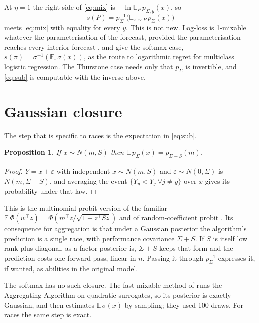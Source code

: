 \documentclass[11pt]{article}
\newtheorem{proposition}{Proposition}
\begin{document}
At $\eta=1$ the right side of \eqref{eq:mix} is $-\ln\mathbb E_P\,
p_{\Sigma,y}(x)$, so
\begin{equation}\label{eq:sub}
  s(P)=p_\Sigma^{-1}\!\big(\mathbb E_{x\sim P}\,p_\Sigma(x)\big)
\end{equation}
meets \eqref{eq:mix} with equality for every $y$. This is not new.
Log-loss is 1-mixable whatever the parameterisation of the forecast,
provided the parameterisation reaches every interior forecast
\citep[Section~6]{vanerven2012}, and \citet{foster2018} give the
softmax case, $s(\pi)=\sigma^{-1}(\mathbb E_\pi\sigma(x))$, as the
route to logarithmic regret for multiclass logistic regression. The
Thurstone case needs only that $p_\Sigma$ is invertible, and
\eqref{eq:sub} is computable with the inverse above.

\section{Gaussian closure}

The step that is specific to races is the expectation in
\eqref{eq:sub}.

\begin{proposition}\label{prop:closure}
If $x\sim N(m,S)$ then $\mathbb E\,p_\Sigma(x)=p_{\Sigma+S}(m)$.
\end{proposition}

\begin{proof}
$Y=x+\varepsilon$ with independent $x\sim N(m,S)$ and
$\varepsilon\sim N(0,\Sigma)$ is $N(m,\Sigma+S)$, and averaging the
event $\{Y_y<Y_j\ \forall j\ne y\}$ over $x$ gives its probability
under that law.
\end{proof}

This is the multinomial-probit version of the familiar
$\mathbb E\,\Phi(w^\top z)=\Phi(m^\top z/\sqrt{1+z^\top Sz})$
\citep[Section~3.9]{rasmussen2006} and of random-coefficient probit
\citep{hausman1978,train2009}. Its consequence for aggregation is that
under a Gaussian posterior the algorithm's prediction is a single race,
with performance covariance $\Sigma+S$. If $S$ is itself low rank plus
diagonal, as a factor posterior is, $\Sigma+S$ keeps that form and the
prediction costs one forward pass, linear in $n$. Passing it through
$p_\Sigma^{-1}$ expresses it, if wanted, as abilities in the original
model.

The softmax has no such closure. The fast mixable method of
\citet{jezequel2021} runs the Aggregating Algorithm on quadratic
surrogates, so its posterior is exactly Gaussian, and then estimates
$\mathbb E\,\sigma(x)$ by sampling; they used 100 draws. For races the
same step is exact.
\end{document}
